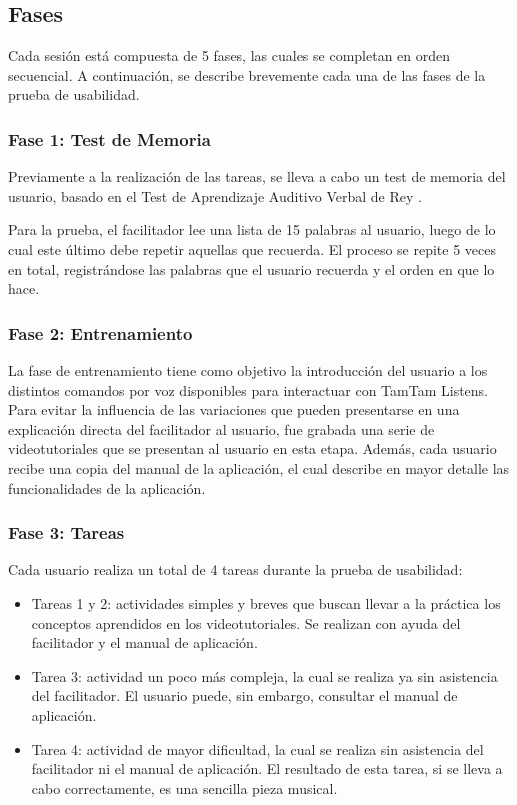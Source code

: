 \subsection{Fases}
Cada sesión está compuesta de 5 fases, las cuales se completan en orden secuencial.
A continuación, se describe brevemente cada una de las fases de la prueba de usabilidad.

\subsubsection{Fase 1: Test de Memoria}
Previamente a la realizaci\'on de las tareas, se lleva a cabo un test de memoria del usuario, basado en
el Test de Aprendizaje Auditivo Verbal de Rey \cite{Lopez1998}. 

Para la prueba, el facilitador lee una lista
de 15 palabras al usuario, luego de lo cual este \'ultimo debe repetir aquellas que recuerda.
El proceso se repite 5 veces en total, registr\'andose las palabras que el usuario recuerda y el orden en que
lo hace.

\subsubsection{Fase 2: Entrenamiento}
La fase de entrenamiento tiene como objetivo la introducci\'on del usuario a los distintos comandos por voz disponibles
para interactuar con TamTam Listens. 
Para evitar la influencia de las variaciones que pueden presentarse en una
explicaci\'on directa del facilitador al usuario, fue grabada una serie de videotutoriales 
que se presentan al usuario en esta etapa.
Adem\'as, cada usuario recibe una copia del manual de la aplicaci\'on, el cual describe en mayor detalle las
funcionalidades de la aplicaci\'on.

\subsubsection{Fase 3: Tareas}
Cada usuario realiza un total de 4 tareas durante la prueba de usabilidad:
	\begin{itemize}			
		\item Tareas 1 y 2: actividades simples y breves que buscan llevar a la pr\'actica los conceptos aprendidos
		en los videotutoriales. Se realizan con ayuda del facilitador y el manual de aplicaci\'on.
		\item Tarea 3: actividad un poco m\'as compleja, la cual se realiza ya sin asistencia del facilitador. El usuario puede, sin embargo, consultar el manual de aplicaci\'on.
		\item Tarea 4: actividad de mayor dificultad, la cual se realiza sin asistencia del facilitador ni el manual de
		aplicaci\'on. El resultado de esta tarea, si se lleva a cabo correctamente, es una sencilla pieza musical.
	\end{itemize}

